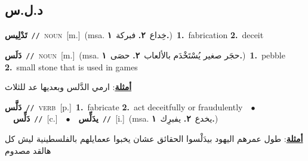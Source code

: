 \documentclass[10pt,a4paper,twoside]{article} %
\begin{document}
\begin{multicols}{2}
\vspace{-3mm}
\subsection*{\color{blue}\foreignlanguage{arabic}{د.ل.س}\color{blue}{}} 

{\setlength\topsep{0pt}\textbf{\foreignlanguage{arabic}{تَدْلِيس}}\ {\color{gray}\texttt{//}\color{black}}\ \textsc{noun}\ [m.]\ \color{gray}(msa. \foreignlanguage{arabic}{خِداع}~\foreignlanguage{arabic}{\textbf{٢.}}  \foreignlanguage{arabic}{فبركة}~\foreignlanguage{arabic}{\textbf{١.}})\color{black}\ \textbf{1.}~fabrication  \textbf{2.}~deceit\ } \vspace{2mm}

{\setlength\topsep{0pt}\textbf{\foreignlanguage{arabic}{دَلَس}}\ {\color{gray}\texttt{//}\color{black}}\ \textsc{noun}\ [m.]\ \color{gray}(msa. \foreignlanguage{arabic}{حجَر صغير يُسْتَخْدَم بالألعاب}~\foreignlanguage{arabic}{\textbf{٢.}}  \foreignlanguage{arabic}{حصَى}~\foreignlanguage{arabic}{\textbf{١.}})\color{black}\ \textbf{1.}~pebble  \textbf{2.}~small stone that is used in games\  \begin{flushright}\color{gray}\foreignlanguage{arabic}{\textbf{\underline{\foreignlanguage{arabic}{أمثلة}}}: ارمي الدَّلس وبعديها عد للثلاث}\end{flushright}\color{black}} \vspace{2mm}

{\setlength\topsep{0pt}\textbf{\foreignlanguage{arabic}{دَلَّس}}\ {\color{gray}\texttt{//}\color{black}}\ \textsc{verb}\ [p.]\ \textbf{1.}~fabricate  \textbf{2.}~act deceitfully or fraudulently\ \ $\bullet$\ \ \setlength\topsep{0pt}\textbf{\foreignlanguage{arabic}{دَلِّس}}\ {\color{gray}\texttt{//}\color{black}}\ [c.]\ \ $\bullet$\ \ \setlength\topsep{0pt}\textbf{\foreignlanguage{arabic}{يدَلِّس}}\ {\color{gray}\texttt{//}\color{black}}\ [i.]\ \color{gray}(msa. \foreignlanguage{arabic}{يخدع}~\foreignlanguage{arabic}{\textbf{٢.}}  \foreignlanguage{arabic}{يفبرِك}~\foreignlanguage{arabic}{\textbf{١.}})\color{black}\  \begin{flushright}\color{gray}\foreignlanguage{arabic}{\textbf{\underline{\foreignlanguage{arabic}{أمثلة}}}: طول عمرهم اليهود بيدَلْسوا الحقائق عشان يخبوا ععمايلهم بالفلسطينية ليش كل هالقد مصدوم}\end{flushright}\color{black}} \vspace{2mm}


\end{multicols}
\end{document}
